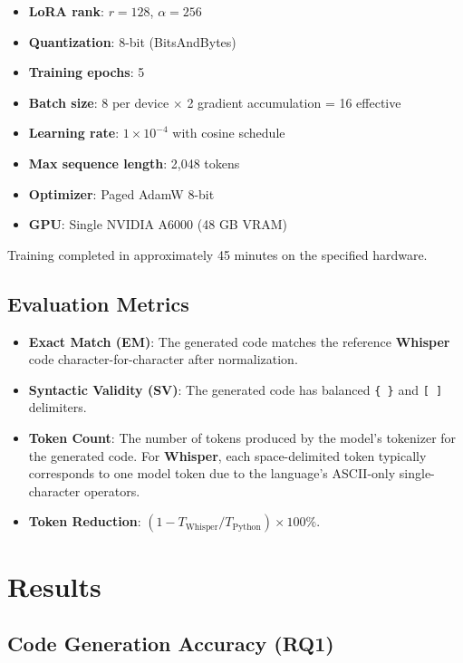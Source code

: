 \documentclass[11pt,a4paper]{article}
\begin{document}
\begin{itemize}
\item \textbf{LoRA rank}: $r = 128$, $\alpha = 256$
\item \textbf{Quantization}: 8-bit (BitsAndBytes)
\item \textbf{Training epochs}: 5
\item \textbf{Batch size}: 8 per device $\times$ 2 gradient accumulation = 16 effective
\item \textbf{Learning rate}: $1 \times 10^{-4}$ with cosine schedule
\item \textbf{Max sequence length}: 2,048 tokens
\item \textbf{Optimizer}: Paged AdamW 8-bit
\item \textbf{GPU}: Single NVIDIA A6000 (48 GB VRAM)
\end{itemize}

Training completed in approximately 45 minutes on the specified hardware.

\subsection{Evaluation Metrics}

\begin{itemize}
\item \textbf{Exact Match (EM)}: The generated code matches the reference
  \textbf{Whisper} code character-for-character after normalization.
\item \textbf{Syntactic Validity (SV)}: The generated code has balanced
  \texttt{\{ \}} and \texttt{[ ]} delimiters.
\item \textbf{Token Count}: The number of tokens produced by the model's
  tokenizer for the generated code. For \textbf{Whisper}, each space-delimited
  token typically corresponds to one model token due to the language's ASCII-only
  single-character operators.
\item \textbf{Token Reduction}: $(1 - T_{\text{Whisper}} /
  T_{\text{Python}}) \times 100\%$.
\end{itemize}

\section{Results}
\label{sec:results}

\subsection{Code Generation Accuracy (RQ1)}
\end{document}
